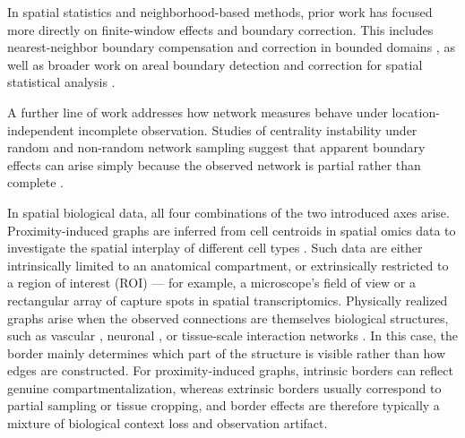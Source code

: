 \documentclass[fleqn,10pt]{olplainarticle}
\begin{document}
In spatial statistics and neighborhood-based methods, prior work has focused more directly on finite-window effects and boundary correction. This includes nearest-neighbor boundary compensation and correction in bounded domains \citep{arya1995accounting, sricharan2010boundary, alizad2011boundary}, as well as broader work on areal boundary detection and correction for spatial statistical analysis \citep{li2011mining}.

A further line of work addresses how network measures behave under location-independent incomplete observation. Studies of centrality instability under random \citep{costenbader2003stability, borgatti2006robustness, smith2013structural} and non-random \citep{smith2017network} network sampling suggest that apparent boundary effects can arise simply because the observed network is partial rather than complete \citep{kossinets2006effects}.

In spatial biological data, all four combinations of the two introduced axes arise. Proximity-induced graphs are inferred from cell centroids in spatial omics data \citep{bressan2023dawn} to investigate the spatial interplay of different cell types \citep{keren2018structured, cheng2026spneigh, schiller2026comparison}. Such data are either intrinsically limited to an anatomical compartment, or extrinsically restricted to a region of interest (ROI) --- for example, a microscope's field of view or a rectangular array of capture spots in spatial transcriptomics. Physically realized graphs arise when the observed connections are themselves biological structures, such as vascular \citep{bumgarner2022open, todorov2020machine}, neuronal \citep{peng2011automatic, de2015graph, radojevic2016fuzzy}, or tissue-scale interaction networks \citep{novkovic2016topological, llewellyn2026topological}. In this case, the border mainly determines which part of the structure is visible rather than how edges are constructed. For proximity-induced graphs, intrinsic borders can reflect genuine compartmentalization, whereas extrinsic borders usually correspond to partial sampling or tissue cropping, and border effects are therefore typically a mixture of biological context loss and observation artifact.
\end{document}
